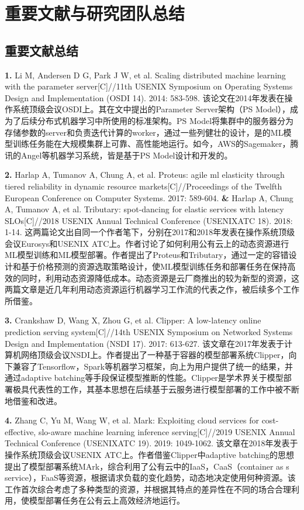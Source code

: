 \chapter{重要文献与研究团队总结}

\section{重要文献总结}
\textbf{1. }Li M, Andersen D G, Park J W, et al. Scaling distributed machine learning with the parameter server[C]//11th {USENIX} Symposium on Operating Systems Design and Implementation ({OSDI} 14). 2014: 583-598. 该论文在2014年发表在操作系统顶级会议OSDI上。其在文中提出的Parameter Server架构（PS Model），成为了后续分布式机器学习中所使用的标准架构。PS Model将集群中的服务器分为存储参数的server和负责迭代计算的worker，通过一些列健壮的设计，是的ML模型训练任务能在大规模集群上可靠、高性能地运行。如今，AWS的Sagemaker\parencite{joshi2020amazon}，腾讯的Angel\parencite{jiang2018angel}等机器学习系统，皆是基于PS Model设计和开发的。

\textbf{2. }Harlap A, Tumanov A, Chung A, et al. Proteus: agile ml elasticity through tiered reliability in dynamic resource markets[C]//Proceedings of the Twelfth European Conference on Computer Systems. 2017: 589-604. \textbf{\&} Harlap A, Chung A, Tumanov A, et al. Tributary: spot-dancing for elastic services with latency SLOs[C]//2018 {USENIX} Annual Technical Conference ({USENIX}{ATC} 18). 2018: 1-14. 这两篇论文出自同一个作者笔下，分别在2017和2018年发表在操作系统顶级会议Eurosys和USENIX ATC上。作者讨论了如何利用公有云上的动态资源进行ML模型训练和ML模型部署。作者提出了Proteus和Tributary，通过一定的容错设计和基于价格预测的资源选取策略设计，使ML模型训练任务和部署任务在保持高效的同时，利用动态资源降低成本。动态资源是云厂商推出的较为新型的资源，这两篇文章是近几年利用动态资源运行机器学习工作流的代表之作，被后续多个工作\parencite{li2020spottune}所借鉴。

\textbf{3. }Crankshaw D, Wang X, Zhou G, et al. Clipper: A low-latency online prediction serving system[C]//14th {USENIX} Symposium on Networked Systems Design and Implementation ({NSDI} 17). 2017: 613-627. 该文章在2017年发表于计算机网络顶级会议NSDI上。作者提出了一种基于容器的模型部署系统Clipper，向下兼容了Tensorflow，Spark等机器学习框架，向上为用户提供了统一的结果，并通过adaptive batching等手段保证模型推断的性能。Clipper是学术界关于模型部署极具代表性的工作，其基本思想在后续基于云服务进行模型部署的工作中\parencite{zhang2019mark}被不断地借鉴和改进。

\textbf{4. }Zhang C, Yu M, Wang W, et al. Mark: Exploiting cloud services for cost-effective, slo-aware machine learning inference serving[C]//2019 {USENIX} Annual Technical Conference ({USENIX}{ATC} 19). 2019: 1049-1062. 该文章在2018年发表于操作系统顶级会议USENIX ATC上。作者借鉴Clipper中adaptive batching的思想提出了模型部署系统MArk，综合利用了公有云中的IaaS，CaaS（container as s service），FaaS等资源，根据请求负载的变化趋势，动态地决定使用何种资源。该工作首次综合考虑了多种类型的资源，并根据其特点的差异性在不同的场合合理利用，使模型部署任务在公有云上高效经济地运行。


